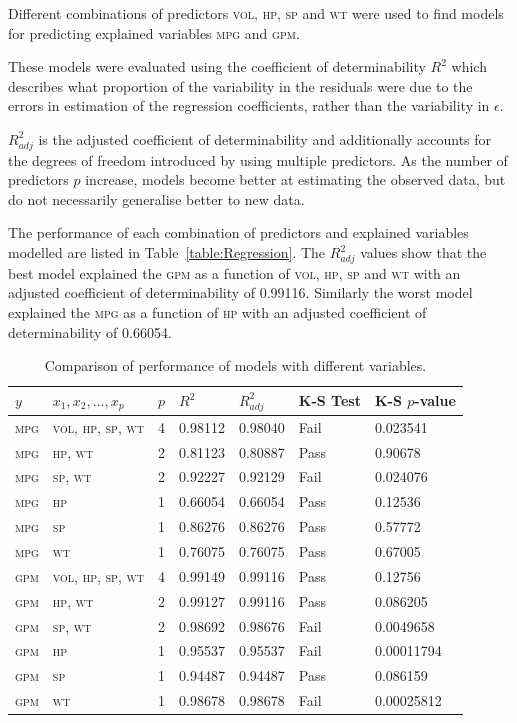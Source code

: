 \documentclass[a4paper,10pt,twocolumn]{article}
\newcommand{\MPG}{\textsc{mpg}\xspace}
\newcommand{\GPM}{\textsc{gpm}\xspace}
\newcommand{\VOL}{\textsc{vol}\xspace}
\newcommand{\HP}{\textsc{hp}\xspace}
\newcommand{\SP}{\textsc{sp}\xspace}
\newcommand{\WT}{\textsc{wt}\xspace}
\begin{document}
Different combinations of predictors \VOL, \HP, \SP and \WT were used to find 
models for predicting explained variables \MPG and \GPM.

These models were evaluated using the coefficient of determinability $R^2$ 
which describes what proportion of the variability in the residuals were due to 
the errors in estimation of the regression coefficients, rather than the 
variability in $\epsilon$.

$R^2_{adj}$ is the adjusted coefficient of determinability and additionally 
accounts for the degrees of freedom introduced by using multiple predictors. As 
the number of predictors $p$ increase, models become better at estimating the 
observed data, but do not necessarily generalise better to new data.

The performance of each combination of predictors and explained variables 
modelled are listed in Table~\vref{table:Regression}. The $R^2_{adj}$ values 
show that the best model explained the \GPM as a function of \VOL, \HP, \SP and 
\WT with an adjusted coefficient of determinability of 0.99116. Similarly the 
worst model explained the \MPG as a function of \HP with an adjusted 
coefficient of determinability of 0.66054.

\begin{table}
    \centering
    \begin{tabular}{lllllll}
    \toprule
    $y$ & $x_1, x_2, ..., x_p$ & $p$ & $R^2$ & $R^2_{adj}$ & K-S Test & K-S 
    $p$-value \\
    \midrule
    \MPG & \VOL, \HP, \SP, \WT & 4 & 0.98112 & 0.98040 & Fail & 0.023541 \\
    \MPG & \HP, \WT            & 2 & 0.81123 & 0.80887 & Pass & 0.90678 \\
    \MPG & \SP, \WT            & 2 & 0.92227 & 0.92129 & Fail & 0.024076 \\
    \MPG & \HP                 & 1 & 0.66054 & 0.66054 & Pass & 0.12536 \\
    \MPG & \SP                 & 1 & 0.86276 & 0.86276 & Pass & 0.57772 \\
    \MPG & \WT                 & 1 & 0.76075 & 0.76075 & Pass & 0.67005 \\
    \GPM & \VOL, \HP, \SP, \WT & 4 & 0.99149 & 0.99116 & Pass & 0.12756 \\
    \GPM & \HP, \WT            & 2 & 0.99127 & 0.99116 & Pass & 0.086205 \\
    \GPM & \SP, \WT            & 2 & 0.98692 & 0.98676 & Fail & 0.0049658 \\
    \GPM & \HP                 & 1 & 0.95537 & 0.95537 & Fail & 0.00011794 \\
    \GPM & \SP                 & 1 & 0.94487 & 0.94487 & Pass & 0.086159 \\
    \GPM & \WT                 & 1 & 0.98678 & 0.98678 & Fail & 0.00025812 \\
    \bottomrule
    \end{tabular}
    \caption{Comparison of performance of models with different variables.}
    \label{table:Regression}
\end{table}
    
\end{document}
